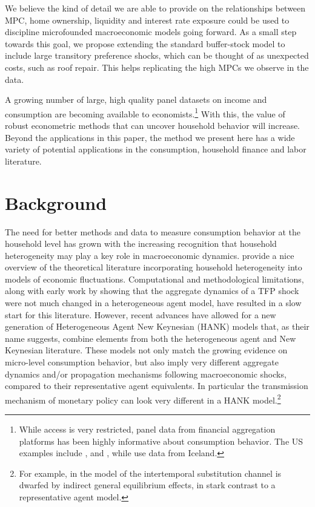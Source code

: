 \documentclass[titlepage]{\econtex}\newcommand{\texname}{ConsumptionHeterogeneity}
\begin{document}
We believe the kind of detail we are able to provide on the relationships between MPC, home ownership, liquidity and interest rate exposure could be used to discipline microfounded macroeconomic models going forward. As a small step towards this goal, we propose extending the standard buffer-stock model to include large transitory preference shocks, which can be thought of as unexpected costs, such as roof repair. This helps replicating the high MPCs we observe in the data. 

A growing number of large, high quality panel datasets on income and consumption are becoming available to economists.\footnote{While access is very restricted, panel data from financial aggregation platforms has been highly informative about consumption behavior. The US examples include \cite{gelman_harnessing_2014}, \cite{ganong_consumer_2017} and \cite{baker_debt_2015}, while \cite{vardardottir_liquid_2016} use data from Iceland.} With this, the value of robust econometric methods that can uncover household behavior will increase. Beyond the applications in this paper, the method we present here has a wide variety of potential applications in the consumption, household finance and labor literature.

\section{Background}
The need for better methods and data to measure consumption behavior at the household level has grown with the increasing recognition that household heterogeneity may play a key role in macroeconomic dynamics. \cite{kaplan_microeconomic_2018} provide a nice overview of the theoretical literature incorporating household heterogeneity into models of economic fluctuations. Computational and methodological limitations, along with early work by \cite{krusell_income_1998} showing that the aggregate dynamics of a TFP shock were not much changed in a heterogeneous agent model, have resulted in a slow start for this literature. However, recent advances have allowed for a new generation of Heterogeneous Agent New Keynesian (HANK) models that, as their name suggests, combine elements from both the heterogeneous agent and New Keynesian literature. These models not only match the growing evidence on micro-level consumption behavior, but also imply very different aggregate dynamics and/or propagation mechanisms following macroeconomic shocks, compared to their representative agent equivalents. In particular the transmission mechanism of monetary policy can look very different in a HANK model.\footnote{For example, in the model of \cite{kaplan_monetary_2016} the intertemporal substitution channel is dwarfed by indirect general equilibrium effects, in stark contrast to a representative agent model.}
\end{document}
